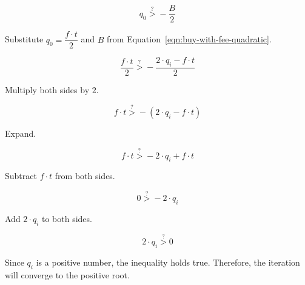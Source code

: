 \begin{equation*}
	q_0 \stackrel{?}{>} - \frac{B}{2}
\end{equation*}

Substitute $q_0 = \dfrac{f \cdot t}{2}$ and $B$ from
Equation~\ref{eqn:buy-with-fee-quadratic}.

\begin{equation*}
	\frac{f \cdot t}{2} \stackrel{?}{>} - \frac{2 \cdot q_i - f \cdot t}{2}
\end{equation*}

Multiply both sides by $2$.

\begin{equation*}
	f \cdot t \stackrel{?}{>} - (2 \cdot q_i - f \cdot t)
\end{equation*}

Expand.

\begin{equation*}
	f \cdot t \stackrel{?}{>} -2 \cdot q_i + f \cdot t
\end{equation*}

Subtract $f \cdot t$ from both sides.

\begin{equation*}
	0 \stackrel{?}{>} -2 \cdot q_i
\end{equation*}

Add $2 \cdot q_i$ to both sides.

\begin{equation*}
	2 \cdot q_i \stackrel{?}{>} 0
\end{equation*}

Since $q_i$ is a positive number, the inequality holds true. Therefore, the iteration
will converge to the positive root.
